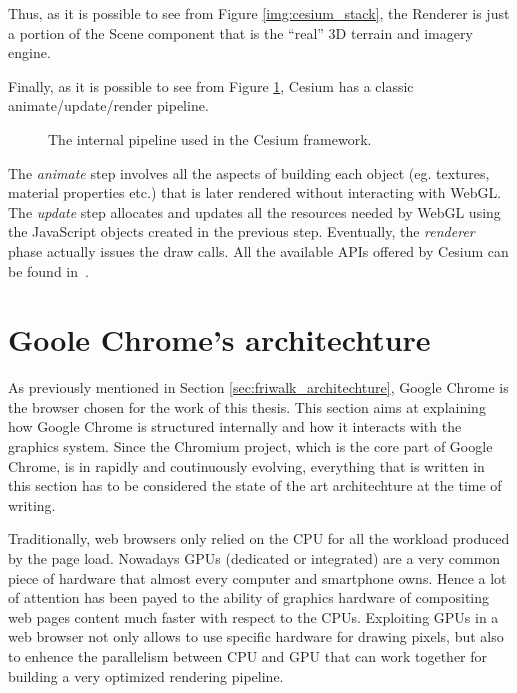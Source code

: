 Thus, as it is possible to see from Figure \ref{img:cesium_stack},
the Renderer is just a portion of the Scene component that is the ``real'' 3D
terrain and imagery engine.

Finally, as it is possible to see from Figure \ref{img:cesium_pipeline},
Cesium has a classic animate/update/render pipeline.
\begin{figure}[!htb]
    \caption{The internal pipeline used in the Cesium framework.}
    \label{img:cesium_pipeline}
\end{figure}

The \emph{animate} step involves all the aspects of building each object (eg.
textures, material properties etc.) that is later rendered without interacting with
WebGL. The \emph{update} step allocates and updates all the resources needed by
WebGL using the JavaScript objects created in the previous step. Eventually, the
\emph{renderer} phase actually issues the draw calls. All the available APIs
offered by Cesium can be found in~\cite{cesiumapi}.


\section{Goole Chrome's architechture}
As previously mentioned in Section \ref{sec:friwalk_architechture}, Google Chrome
is the browser chosen for the work of this thesis. This section aims at explaining
how Google Chrome is structured internally and how it interacts with the graphics
system. Since the Chromium project, which is the core part of Google Chrome, is
in rapidly and coutinuously evolving, everything that is written in this section
has to be considered the state of the art architechture at the time of writing.

Traditionally, web browsers only relied on the CPU for all the workload produced
by the page load. Nowadays GPUs (dedicated or integrated) are a very common piece
of hardware that almost every computer and smartphone owns. Hence a lot of attention
has been payed to the ability of graphics hardware of compositing web pages content
much faster with respect to the CPUs. Exploiting GPUs in a web
browser not only allows to use specific hardware for drawing pixels, but also to
enhence the parallelism between CPU and GPU that can work together for building
a very optimized rendering pipeline.

